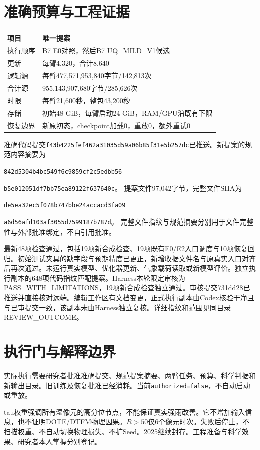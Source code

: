 \documentclass[UTF8,10.5pt,a4paper,fontset=none]{ctexart}
\begin{document}
\section*{准确预算与工程证据}
\begin{tabularx}{\textwidth}{@{}lX@{}}
\toprule 项目 & 唯一提案\\\midrule
执行顺序 & B7 E0对照，然后B7 UQ\_MILD\_V1候选\\
更新 & 每臂4,320，合计8,640\\
逻辑源 & 每臂477,571,953,840字节/142,813次\\
合计源 & 955,143,907,680字节/285,626次\\
时限 & 每臂21,600秒，整包43,200秒\\
存储 & 初始48 GiB，每臂启动24 GiB，RAM/GPU沿既有下限\\
恢复边界 & 新原初态，checkpoint加载0，重放0，额外重试0\\\bottomrule
\end{tabularx}

准确代码提交\texttt{f43b4225fef462a31035d59a06b85f31e5b257dc}已推送。新提案的规范内容摘要为\par
\texttt{842d5304b4bc549f6c9859cf2c5edbb56}\par
\texttt{b5e012051df7bb75ea89122f637640c}。
提案文件97,042字节，完整文件SHA为\par
\texttt{de5ea32ec5f078b747bbe24accacd3fa09}\par
\texttt{a6d56afd103af3055d7599187b787d}。
完整文件指纹与规范摘要分别用于文件完整性与外部批准绑定，不自引用批准。

最新48项检查通过，包括19项新合成检查、19项既有E0/E2入口调度与10项恢复回归。初始测试夹具的缺字段与预期精度已更正，新增收据文件名与原真实入口对齐后再次通过。未运行真实模型、优化器更新、气象载荷读取或新模型评价。独立执行副本的648项代码指纹匹配提案。Harness本轮限定审核为PASS\_WITH\_LIMITATIONS，19项新合成检查独立通过。审核提交731dd28已推送并直接核对远端。编辑工作区有文档变更，正式执行副本由Codex核验干净且与已审提交一致，该副本未由Harness独立复核。详细指纹和范围见同目录REVIEW\_OUTCOME。

\section*{执行门与解释边界}
实际执行需要研究者批准准确提交、规范提案摘要、两臂任务、预算、科学判据和新输出目录。旧训练及恢复批准已经消耗。当前\texttt{authorized=false}，不自动启动或重放。

tau权重强调所有湿像元的高分位节点，不能保证真实强雨改善。它不增加输入信息，也不证明DOTE/DTFM物理因果。$R>50$仅6个像元时次。失败后停止，不扫描权重、不自动切换物理损失、不扩Seed。2025继续封存。工程准备与科学效果、研究者本人掌握分别登记。
\end{document}
